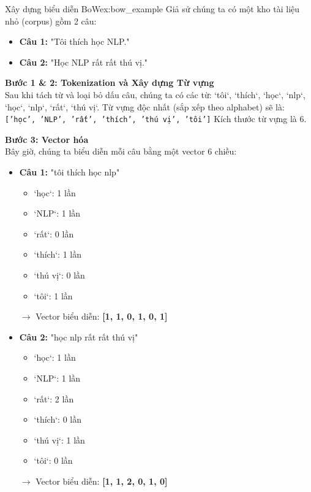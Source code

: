 \begin{example}{Xây dựng biểu diễn BoW}{ex:bow_example}
    Giả sử chúng ta có một kho tài liệu nhỏ (corpus) gồm 2 câu:
    \begin{itemize}
        \item \textbf{Câu 1:} "Tôi thích học NLP."
        \item \textbf{Câu 2:} "Học NLP rất rất thú vị."
    \end{itemize}
    
    \textbf{Bước 1 \& 2: Tokenization và Xây dựng Từ vựng} \\
    Sau khi tách từ và loại bỏ dấu câu, chúng ta có các từ: `tôi`, `thích`, `học`, `nlp`, `học`, `nlp`, `rất`, `thú vị`.
    Từ vựng độc nhất (sắp xếp theo alphabet) sẽ là:
    \texttt{['học', 'NLP', 'rất', 'thích', 'thú vị', 'tôi']}
    Kích thước từ vựng là 6.
    
    \textbf{Bước 3: Vector hóa} \\
    Bây giờ, chúng ta biểu diễn mỗi câu bằng một vector 6 chiều:
    \begin{itemize}
        \item \textbf{Câu 1:} "tôi thích học nlp"
            \begin{itemize}
                \item `học`: 1 lần
                \item `NLP`: 1 lần
                \item `rất`: 0 lần
                \item `thích`: 1 lần
                \item `thú vị`: 0 lần
                \item `tôi`: 1 lần
            \end{itemize}
            \(\rightarrow\) Vector biểu diễn: \textbf{[1, 1, 0, 1, 0, 1]}
        
        \item \textbf{Câu 2:} "học nlp rất rất thú vị"
            \begin{itemize}
                \item `học`: 1 lần
                \item `NLP`: 1 lần
                \item `rất`: 2 lần
                \item `thích`: 0 lần
                \item `thú vị`: 1 lần
                \item `tôi`: 0 lần
            \end{itemize}
            \(\rightarrow\) Vector biểu diễn: \textbf{[1, 1, 2, 0, 1, 0]}
    \end{itemize}
\end{example}

